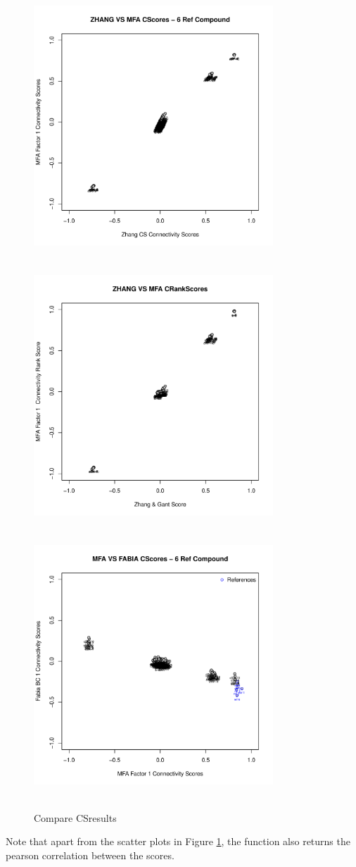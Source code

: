 \documentclass[a4paper]{article}\usepackage[]{graphicx}\usepackage[]{color}
\newenvironment{knitrout}{}{} %
\begin{document}
\begin{knitrout}
\begin{figure}[H]
\includegraphics[width=9cm,height=10cm]{figure/CScompare-1} 
\includegraphics[width=9cm,height=10cm]{figure/CScompare-2} 
\includegraphics[width=9cm,height=10cm]{figure/CScompare-3} \hfill{}

\caption[Compare CSresults]{Compare CSresults\label{fig:CScompare}}
\end{figure}


\end{knitrout}
\noindent Note that apart from the scatter plots in Figure \ref{fig:CScompare},
the function also returns the pearson correlation between the scores.

\newpage


\end{document}
